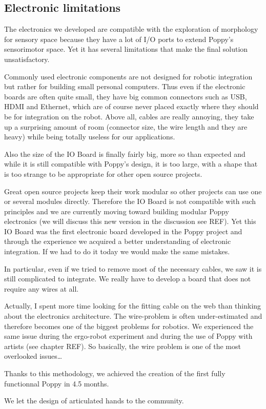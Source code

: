 \subsection{Electronic limitations} %

The electronics we developed are compatible with the exploration of morphology for sensory space because they have a lot of I/O ports to extend Poppy's sensorimotor space. Yet it has several limitations that make the final solution unsatisfactory.

Commonly used electronic components are not designed for robotic integration but rather for building small personal computers. Thus even if the electronic boards are often quite small, they have big common connectors such as USB, HDMI and Ethernet, which are of course never placed exactly where they should be for integration on the robot.
Above all, cables are really annoying, they take up a surprising amount of room (connector size, the wire length and they are heavy) while being totally useless for our applications.

Also the size of the IO Board is finally fairly big, more so than expected and while it is still compatible with Poppy’s design, it is too large, with a shape that is too strange to be appropriate for other open source projects.

Great open source projects keep their work modular so other projects can use one or several modules directly. Therefore the IO Board is not compatible with such principles and we are currently moving toward building modular Poppy electronics (we will discuss this new version in the discussion see REF). Yet this IO Board was the first electronic board developed in the Poppy project and through the experience we acquired a better understanding of electronic integration. If we had to do it today we would make the same mistakes.

In particular, even if we tried to remove most of the necessary cables, we saw it is still complicated to integrate. We really have to develop a board that does not require any wires at all.

Actually, I spent more time looking for the fitting cable on the web than thinking about the electronics architecture. The wire-problem is often under-estimated and therefore becomes one of the biggest problems for robotics. We experienced the same issue during the ergo-robot experiment and during the use of Poppy with artists (see chapter REF). So basically, the wire problem is one of the most overlooked issues…




Thanks to this methodology, we achieved the creation of the first fully functionnal Poppy in 4.5 months.

We let the design of articulated hands to the community.

